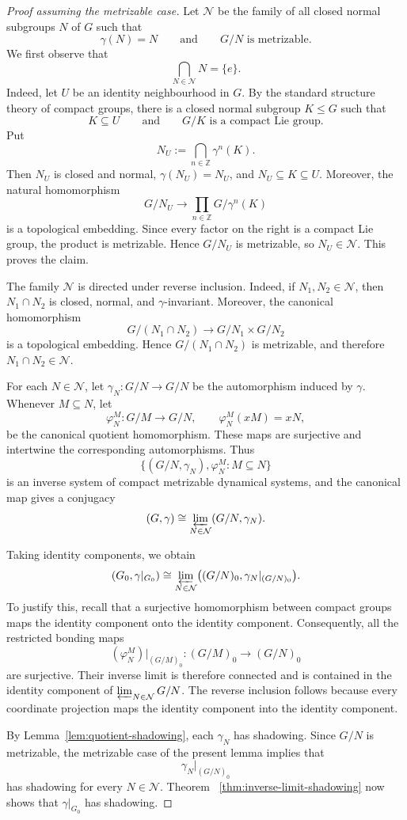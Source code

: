 \documentclass[12pt]{amsart}
\theoremstyle{definition}
\numberwithin{equation}{section}
\theoremstyle{remark}
\begin{document}
\begin{proof}[Proof assuming the metrizable case]
	Let $\mathcal N$ be the family of all closed normal subgroups $N$ of
	$G$ such that
	\[
	\gamma(N)=N
	\qquad\text{and}\qquad
	G/N\text{ is metrizable}.
	\]
	We first observe that
	\[
	\bigcap_{N\in\mathcal N}N=\{e\}.
	\]
	Indeed, let $U$ be an identity neighbourhood in $G$. By the standard
	structure theory of compact groups, there is a closed normal subgroup
	$K\leq G$ such that
	\[
	K\subseteq U
	\qquad\text{and}\qquad
	G/K\text{ is a compact Lie group}.
	\]
	Put
	\[
	N_U:=\bigcap_{n\in\mathbb Z}\gamma^n(K).
	\]
	Then $N_U$ is closed and normal, $\gamma(N_U)=N_U$, and
	$N_U\subseteq K\subseteq U$. Moreover, the natural homomorphism
	\[
	G/N_U\longrightarrow
	\prod_{n\in\mathbb Z}G/\gamma^n(K)
	\]
	is a topological embedding. Since every factor on the right is a
	compact Lie group, the product is metrizable. Hence $G/N_U$ is
	metrizable, so $N_U\in\mathcal N$. This proves the claim.
	
	The family $\mathcal N$ is directed under reverse inclusion. Indeed,
	if $N_1,N_2\in\mathcal N$, then $N_1\cap N_2$ is closed, normal, and
	$\gamma$-invariant. Moreover, the canonical homomorphism
	\[
	G/(N_1\cap N_2)
	\longrightarrow
	G/N_1\times G/N_2
	\]
	is a topological embedding. Hence $G/(N_1\cap N_2)$ is metrizable,
	and therefore $N_1\cap N_2\in\mathcal N$.
	
	For each $N\in\mathcal N$, let $\gamma_N:G/N\longrightarrow G/N$
	be the automorphism induced by $\gamma$.  Whenever $M\subseteq N$, let
	\[
	\varphi_N^M:G/M\longrightarrow G/N,
	\qquad
	\varphi_N^M(xM)=xN,
	\]
	be the canonical quotient homomorphism. These maps are surjective and
	intertwine the corresponding automorphisms. Thus
	\[
	\bigl\{(G/N,\gamma_N),\varphi_N^M:M\subseteq N\bigr\}
	\]
	is an inverse system of compact metrizable dynamical systems, and the
	canonical map gives a conjugacy
	\[
	(G,\gamma)
	\cong
	\varprojlim_{N\in\mathcal N}(G/N,\gamma_N).
	\]
	
	Taking identity components, we obtain
	\[
	(G_0,\gamma|_{G_0})
	\cong
	\varprojlim_{N\in\mathcal N}
	\bigl((G/N)_0,\gamma_N|_{(G/N)_0}\bigr).
	\]
	To justify this, recall that a surjective homomorphism between compact
	groups maps the identity component onto the identity component.
	Consequently, all the restricted bonding maps
	\[
	(\varphi_N^M)|_{(G/M)_0}:(G/M)_0\longrightarrow(G/N)_0
	\]
	are surjective. Their inverse limit is therefore connected and is
	contained in the identity component of
	$\varprojlim_{N\in\mathcal N}G/N$. The reverse inclusion follows
	because every coordinate projection maps the identity component into
	the identity component.
	
	By Lemma~\ref{lem:quotient-shadowing}, each $\gamma_N$ has shadowing.
	Since $G/N$ is metrizable, the metrizable case of the present lemma
	implies that
	\[
	\gamma_N|_{(G/N)_0}
	\]
	has shadowing for every $N\in\mathcal N$. Theorem~
	\ref{thm:inverse-limit-shadowing} now shows that
	$\gamma|_{G_0}$ has shadowing.
\end{proof}
\end{document}
